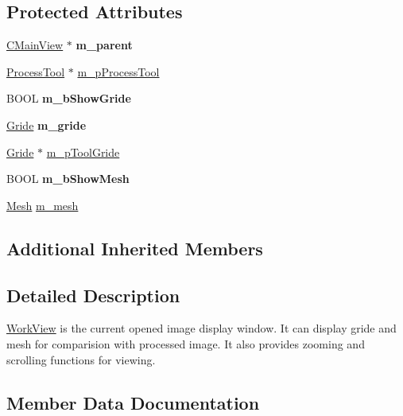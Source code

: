 \subsection*{Protected Attributes}
\begin{DoxyCompactItemize}
\item 
\mbox{\label{class_work_view_aa9e63e4f5c106048c266408640295045}} 
\mbox{\hyperlink{class_c_main_view}{C\+Main\+View}} $\ast$ {\bfseries m\+\_\+parent}
\item 
\mbox{\hyperlink{class_process_tool}{Process\+Tool}} $\ast$ \mbox{\hyperlink{class_work_view_ae70044302a41f2ad4315159eb07c6451}{m\+\_\+p\+Process\+Tool}}
\item 
\mbox{\label{class_work_view_a22980da53a224fb6bc98fd1761196561}} 
B\+O\+OL {\bfseries m\+\_\+b\+Show\+Gride}
\item 
\mbox{\label{class_work_view_a684a8e103025c104c7b39c1c26e5a5b3}} 
\mbox{\hyperlink{class_gride}{Gride}} {\bfseries m\+\_\+gride}
\item 
\mbox{\hyperlink{class_gride}{Gride}} $\ast$ \mbox{\hyperlink{class_work_view_a9e286bc84a23735521f04f1c93598a07}{m\+\_\+p\+Tool\+Gride}}
\item 
\mbox{\label{class_work_view_a6ffb988df047900be9e1281a1a322c96}} 
B\+O\+OL {\bfseries m\+\_\+b\+Show\+Mesh}
\item 
\mbox{\hyperlink{class_mesh}{Mesh}} \mbox{\hyperlink{class_work_view_a75b75053528bcfe74fc2805fd723bc05}{m\+\_\+mesh}}
\end{DoxyCompactItemize}
\subsection*{Additional Inherited Members}


\subsection{Detailed Description}
\mbox{\hyperlink{class_work_view}{Work\+View}} is the current opened image display window. It can display gride and mesh for comparision with processed image. It also provides zooming and scrolling functions for viewing. 

\subsection{Member Data Documentation}
\mbox{\label{class_work_view_a75b75053528bcfe74fc2805fd723bc05}} 
